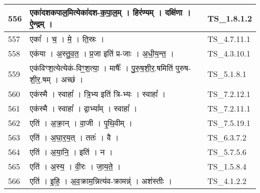 \documentclass[17pt]{extarticle}
\begin{document}
\begin{longtable}{||p{0.4in}||p{4.9in}||p{0.9in}||}
    \hline
        
    556 & एका॑दशकपाल॒मित्येका॑दश{-}क॒पा॒ल॒म्   ।   हिर॑ण्यम्   ।   दक्षि॑णा   ।   ऐ॒न्द्रम्   ।    & TS\_1.8.1.2       \\
    
    \hline
        
    557 & एका᳚   ।   च॒   ।   मे॒   ।   ति॒स्रः   ।    & TS\_4.7.11.1       \\
    
    \hline
        
    558 & एक॑या   ।   अ॒स्तु॒व॒त॒   ।   प्र॒जा इति॑ प्र{-}जाः   ।   अ॒धी॒य॒न्त॒   ।    & TS\_4.3.10.1       \\
    
    \hline
        
    559 & एक॑विꣳश॒त्येत्येक॑{-}विꣳ॒॒श॒त्या॒   ।   माषैः᳚   ।   पु॒रु॒ष॒शी॒र॒.षमिति॑ पुरुष{-}शी॒र॒.षम्   ।   अच्छ॑   ।    & TS\_5.1.8.1       \\
    
    \hline
        
    560 & एक॑स्मै   ।   स्वाहा᳚   ।   त्रि॒भ्य इति॑ त्रि{-}भ्यः   ।   स्वाहा᳚   ।    & TS\_7.2.12.1       \\
    
    \hline
        
    561 & एक॑स्मै   ।   स्वाहा᳚   ।   द्वाभ्या᳚म्   ।   स्वाहा᳚   ।    & TS\_7.2.11.1       \\
    
    \hline
        
    562 & एति॑   ।   अ॒क्रा॒न्   ।   वा॒जी   ।   पृ॒थि॒वीम्   ।    & TS\_7.5.19.1       \\
    
    \hline
        
    563 & एति॑   ।   अ॒घा॒र॒य॒त्   ।   ततः॑   ।   वै   ।    & TS\_6.3.7.2       \\
    
    \hline
        
    564 & एति॑   ।   अ॒या॒नि॒   ।   इति॑   ।   न   ।    & TS\_5.7.5.6       \\
    
    \hline
        
    565 & एति॑   ।   अ॒स्य॒   ।   वी॒रः   ।   जा॒य॒ते॒   ।    & TS\_1.5.8.4       \\
    
    \hline
        
    566 & एति॑   ।   इ॒हि॒   ।   अ॒व॒क्राम॒न्नित्य॑व{-}क्रामन्न्॑   ।   अश॑स्तीः   ।    & TS\_4.1.2.2       \\
    

\end{longtable}
\end{document}
